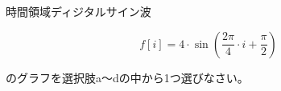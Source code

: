 時間領域ディジタルサイン波 

\[
f[i] = 4 \cdot \sin \left ( \frac{2 \pi}{4} \cdot i  + \frac{\pi}{2} \right )
\]

\noindent のグラフを選択肢a〜dの中から1つ選びなさい。
